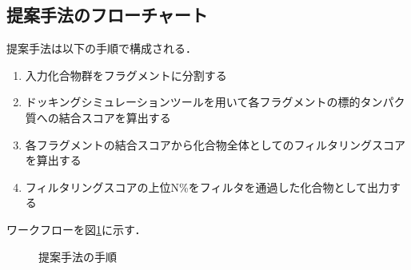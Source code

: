 \subsection{提案手法のフローチャート}\label{subsec:flowchart}
提案手法は以下の手順で構成される．
\begin{enumerate}
\item 入力化合物群をフラグメントに分割する
\item ドッキングシミュレーションツールを用いて各フラグメントの標的タンパク質への結合スコアを算出する
\item 各フラグメントの結合スコアから化合物全体としてのフィルタリングスコアを算出する
\item フィルタリングスコアの上位N\%をフィルタを通過した化合物として出力する
\end{enumerate}
ワークフローを図\ref{fig:workflow}に示す．

\begin{figure}[p]
 \begin{center}
  \caption{提案手法の手順}
  \label{fig:workflow}
 \end{center}
\end{figure}


